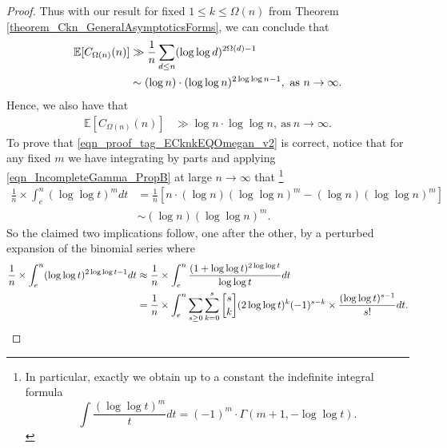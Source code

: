 \documentclass[11pt,reqno,a4letter]{article}
\numberwithin{figure}{section}
\numberwithin{table}{section}
\newcommand{\gkpSI}[2]{\ensuremath{\genfrac{\lbrack}{\rbrack}{0pt}{}{#1}{#2}}}
\newcommand{\cf}{\textit{cf.\ }}
\theoremstyle{plain}
\numberwithin{theorem}{section}
\theoremstyle{definition}
\begin{document}
\begin{proof}
Thus with our result for fixed $1 \leq k \leq \Omega(n)$ from 
Theorem \ref{theorem_Ckn_GeneralAsymptoticsForms}, 
we can conclude that 
\begin{align} 
\notag 
\mathbb{E}[C_{\Omega(n)}(n)] & \gg \frac{1}{n} \sum_{d \leq n} (\log\log d)^{2\Omega(d)-1} \\ 
\label{eqn_proof_tag_ECknkEQOmegan_v2} 
     & \sim (\log n) \cdot (\log\log n)^{2\log\log n - 1}, \mathrm{\ as\ } n \rightarrow \infty. 
\end{align} 
Hence, we also have that 
\begin{align*} 
\mathbb{E}[C_{\Omega(n)}(n)] & \gg \log n \cdot \log\log n, \mathrm{\ as\ } n \rightarrow \infty. 
\end{align*} 
To prove that \eqref{eqn_proof_tag_ECknkEQOmegan_v2} is correct, notice that 
for any fixed $m$ we have integrating by parts and applying \eqref{eqn_IncompleteGamma_PropB} at 
large $n \rightarrow \infty$ that \footnote{ 
     In particular, exactly we obtain up to a constant the indefinite integral formula 
     \[
     \int \frac{(\log\log t)^{m}}{t} dt = (-1)^m \cdot \Gamma(m+1, -\log\log t). 
     \]
}
\begin{align*} 
\frac{1}{n} \times \int_{e}^{n} (\log\log t)^m dt & = \frac{1}{n}\left[ 
     n \cdot (\log n) (\log\log n)^m - (\log n) (\log\log n)^m\right] \\ 
     & \sim (\log n) (\log\log n)^m. 
\end{align*} 
So the claimed two implications follow, one after the other, by a 
perturbed expansion of the binomial series where \cite[\cf \S 6]{GKP} 
\begin{align*} 
\frac{1}{n} \times \int_{e}^{n} (\log\log t)^{2\log\log t - 1} dt & \approx 
     \frac{1}{n} \times \int_{e}^{n} \frac{(1 + \log\log t)^{2\log\log t}}{\log\log t} dt \\ 
     & = \frac{1}{n} \times \int_{e}^{n} 
     \sum_{s \geq 0} \sum_{k=0}^{s} \gkpSI{s}{k} (2\log\log t)^{k} (-1)^{s-k} \times 
     \frac{(\log\log t)^{s-1}}{s!} dt. 
     \qedhere 
\end{align*} 
\end{proof} 
\end{document}
